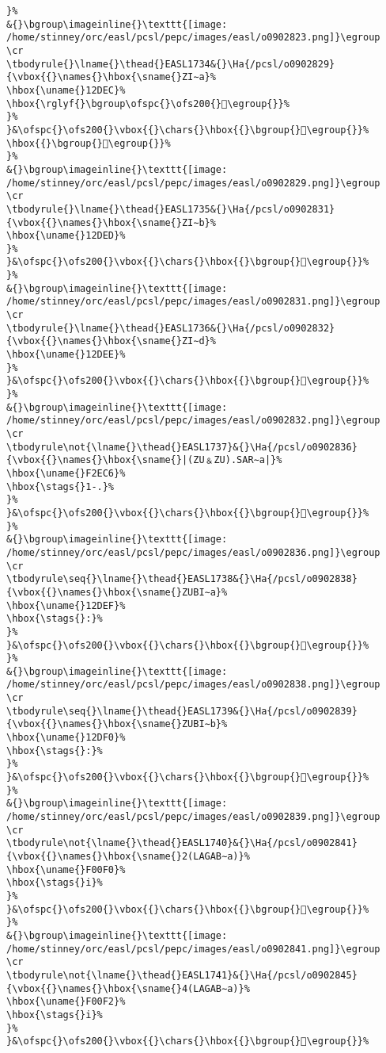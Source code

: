 \begin{verbatim}
}%
&{}\bgroup\imageinline{}\texttt{[image: /home/stinney/orc/easl/pcsl/pepc/images/easl/o0902823.png]}\egroup
\cr
\tbodyrule{}\lname{}\thead{}EASL1734&{}\Ha{/pcsl/o0902829}{\vbox{{}\names{}\hbox{\sname{}ZI∼a}%
\hbox{\uname{}12DEC}%
\hbox{\rglyf{}\bgroup\ofspc{}\ofs200{}𒷬\egroup{}}%
}%
}&\ofspc{}\ofs200{}\vbox{{}\chars{}\hbox{{}\bgroup{}𒷫\egroup{}}%
\hbox{{}\bgroup{}𒷬\egroup{}}%
}%
&{}\bgroup\imageinline{}\texttt{[image: /home/stinney/orc/easl/pcsl/pepc/images/easl/o0902829.png]}\egroup
\cr
\tbodyrule{}\lname{}\thead{}EASL1735&{}\Ha{/pcsl/o0902831}{\vbox{{}\names{}\hbox{\sname{}ZI∼b}%
\hbox{\uname{}12DED}%
}%
}&\ofspc{}\ofs200{}\vbox{{}\chars{}\hbox{{}\bgroup{}𒷭\egroup{}}%
}%
&{}\bgroup\imageinline{}\texttt{[image: /home/stinney/orc/easl/pcsl/pepc/images/easl/o0902831.png]}\egroup
\cr
\tbodyrule{}\lname{}\thead{}EASL1736&{}\Ha{/pcsl/o0902832}{\vbox{{}\names{}\hbox{\sname{}ZI∼d}%
\hbox{\uname{}12DEE}%
}%
}&\ofspc{}\ofs200{}\vbox{{}\chars{}\hbox{{}\bgroup{}𒷮\egroup{}}%
}%
&{}\bgroup\imageinline{}\texttt{[image: /home/stinney/orc/easl/pcsl/pepc/images/easl/o0902832.png]}\egroup
\cr
\tbodyrule\not{\lname{}\thead{}EASL1737}&{}\Ha{/pcsl/o0902836}{\vbox{{}\names{}\hbox{\sname{}|(ZU﹠ZU).SAR∼a|}%
\hbox{\uname{}F2EC6}%
\hbox{\stags{}1-.}%
}%
}&\ofspc{}\ofs200{}\vbox{{}\chars{}\hbox{{}\bgroup{}󲻆\egroup{}}%
}%
&{}\bgroup\imageinline{}\texttt{[image: /home/stinney/orc/easl/pcsl/pepc/images/easl/o0902836.png]}\egroup
\cr
\tbodyrule\seq{}\lname{}\thead{}EASL1738&{}\Ha{/pcsl/o0902838}{\vbox{{}\names{}\hbox{\sname{}ZUBI∼a}%
\hbox{\uname{}12DEF}%
\hbox{\stags{}:}%
}%
}&\ofspc{}\ofs200{}\vbox{{}\chars{}\hbox{{}\bgroup{}𒷯\egroup{}}%
}%
&{}\bgroup\imageinline{}\texttt{[image: /home/stinney/orc/easl/pcsl/pepc/images/easl/o0902838.png]}\egroup
\cr
\tbodyrule\seq{}\lname{}\thead{}EASL1739&{}\Ha{/pcsl/o0902839}{\vbox{{}\names{}\hbox{\sname{}ZUBI∼b}%
\hbox{\uname{}12DF0}%
\hbox{\stags{}:}%
}%
}&\ofspc{}\ofs200{}\vbox{{}\chars{}\hbox{{}\bgroup{}𒷰\egroup{}}%
}%
&{}\bgroup\imageinline{}\texttt{[image: /home/stinney/orc/easl/pcsl/pepc/images/easl/o0902839.png]}\egroup
\cr
\tbodyrule\not{\lname{}\thead{}EASL1740}&{}\Ha{/pcsl/o0902841}{\vbox{{}\names{}\hbox{\sname{}2(LAGAB∼a)}%
\hbox{\uname{}F00F0}%
\hbox{\stags{}i}%
}%
}&\ofspc{}\ofs200{}\vbox{{}\chars{}\hbox{{}\bgroup{}󰃰\egroup{}}%
}%
&{}\bgroup\imageinline{}\texttt{[image: /home/stinney/orc/easl/pcsl/pepc/images/easl/o0902841.png]}\egroup
\cr
\tbodyrule\not{\lname{}\thead{}EASL1741}&{}\Ha{/pcsl/o0902845}{\vbox{{}\names{}\hbox{\sname{}4(LAGAB∼a)}%
\hbox{\uname{}F00F2}%
\hbox{\stags{}i}%
}%
}&\ofspc{}\ofs200{}\vbox{{}\chars{}\hbox{{}\bgroup{}󰃲\egroup{}}%

\end{verbatim}
